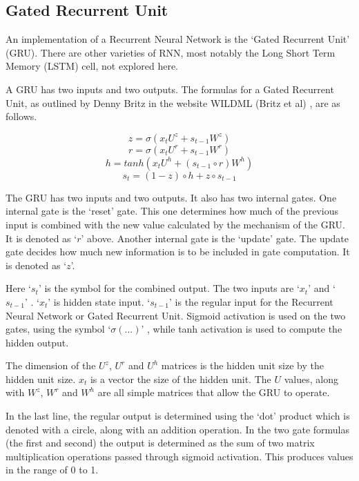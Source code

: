 \subsection{Gated Recurrent Unit}
An implementation of a Recurrent Neural Network is the `Gated Recurrent Unit' (GRU). There are other varieties of RNN, most notably the Long Short Term Memory (LSTM) cell, not explored here. %

A \ac{GRU} has two inputs and two outputs. The formulas for a Gated Recurrent Unit, as outlined by Denny Britz in the website WILDML (Britz et al) \cite{2015Britz}, are as follows.

\begin{minipage}{5in}

$$ z =\sigma(x_tU^z + s_{t-1} W^z) $$  
$$ r =\sigma(x_t U^r +s_{t-1} W^r) $$  
$$ h = tanh(x_t U^h + (s_{t-1} \circ r) W^h) $$  
$$ s_t = (1 - z) \circ h + z \circ s_{t-1} $$  

\end{minipage}

\bigskip \bigskip

The GRU has two inputs and two outputs. It also has two internal gates. One internal gate is the `reset' gate. This one determines how much of the previous input is combined with the new value calculated by the mechanism of the GRU. It is denoted as `$r$' above. Another internal gate is the `update' gate. The update gate decides how much new information is to be included in gate computation. It is denoted as `$z$'.

Here `$ s_t $' is the symbol for the combined output. The two inputs are `$ x_t $' and `$ s_{t-1} $' . `$ x_t $' is hidden state input. `$ s_{t-1} $' is the regular input for the Recurrent Neural Network or Gated Recurrent Unit. Sigmoid activation is used on the two gates, using the symbol `$ \sigma(...) $' , while tanh activation is used to compute the hidden output. 

The dimension of the $U^z$, $U^r$ and $U^h$ matrices is the hidden unit size by the hidden unit size. $ x_t $ is a vector the size of the hidden unit. The $U$ values, along with $ W^z $, $ W^r $ and $ W^h $  are all simple matrices that allow the GRU to operate.

In the last line, the regular output is determined using the `dot' product which is denoted with a circle, along with an addition operation. In the two gate formulas (the first and second) the output is determined as the sum of two matrix multiplication operations passed through sigmoid activation. This produces values in the range of 0 to 1.

